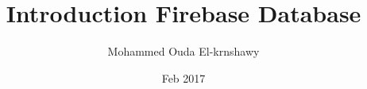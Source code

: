 \documentclass[a4paper,12pt]{book}
\begin{document}
\author{Mohammed Ouda El-krnshawy}
\title{Introduction Firebase Database }
\date{Feb 2017}
\frontmatter
\maketitle


\tableofcontents

\mainmatter






\backmatter


\end{document}
